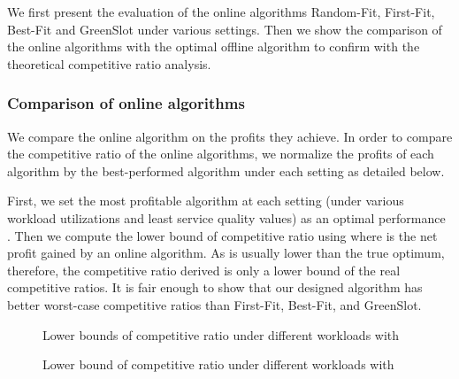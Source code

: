 \documentclass[conference]{IEEEtran}
\begin{document}
We first present the evaluation of the online algorithms Random-Fit, First-Fit, Best-Fit and GreenSlot under various settings. Then we show the comparison of the online algorithms with the optimal offline algorithm to confirm with the theoretical competitive ratio analysis.

\subsubsection{Comparison of online algorithms}


















We compare the online algorithm on the profits they achieve. In order to compare the competitive ratio of the online algorithms, we normalize the profits of each algorithm by the best-performed algorithm under each setting as detailed below.


First, we set the most profitable algorithm at each setting (under various workload utilizations and least service quality  values) as an optimal performance . Then we compute the lower bound of competitive ratio using  where  is the net profit gained by an online algorithm. As  is usually lower than the true optimum, therefore, the competitive ratio derived is only a lower bound of the real competitive ratios. It is fair enough to show that our designed  algorithm has better worst-case competitive ratios than First-Fit, Best-Fit, and GreenSlot.



\begin{figure}
  \centering
\caption{Lower bounds of competitive ratio  under different workloads \newline with }
\label{fig:prfits_0.2}
\end{figure}


\begin{figure}
  \centering
\caption{Lower bound of competitive ratio under different workloads \newline with }
\label{fig:prfits_0.05}
\end{figure}
\end{document}
